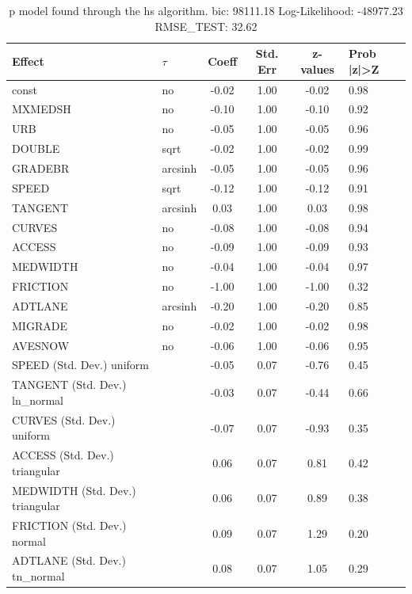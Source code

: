 \begin{table}
	\caption{p model found through the hs algorithm. bic: 98111.18 Log-Likelihood: -48977.23 RMSE_TEST: 32.62}
	\begin{center}
		\begin{tabular}{|l|l|c|c|c|l|}
			\hline
			Effect & $\tau$ & Coeff & Std. Err & z-values & Prob |z|>Z \\
			\hline
			const & no & -0.02 & 1.00 & -0.02 & 0.98 \\
			\hline
			MXMEDSH & no & -0.10 & 1.00 & -0.10 & 0.92 \\
			\hline
			URB & no & -0.05 & 1.00 & -0.05 & 0.96 \\
			\hline
			DOUBLE & sqrt & -0.02 & 1.00 & -0.02 & 0.99 \\
			\hline
			GRADEBR & arcsinh & -0.05 & 1.00 & -0.05 & 0.96 \\
			\hline
			SPEED & sqrt & -0.12 & 1.00 & -0.12 & 0.91 \\
			\hline
			TANGENT & arcsinh & 0.03 & 1.00 & 0.03 & 0.98 \\
			\hline
			CURVES & no & -0.08 & 1.00 & -0.08 & 0.94 \\
			\hline
			ACCESS & no & -0.09 & 1.00 & -0.09 & 0.93 \\
			\hline
			MEDWIDTH & no & -0.04 & 1.00 & -0.04 & 0.97 \\
			\hline
			FRICTION & no & -1.00 & 1.00 & -1.00 & 0.32 \\
			\hline
			ADTLANE & arcsinh & -0.20 & 1.00 & -0.20 & 0.85 \\
			\hline
			MIGRADE & no & -0.02 & 1.00 & -0.02 & 0.98 \\
			\hline
			AVESNOW & no & -0.06 & 1.00 & -0.06 & 0.95 \\
			\hline
			SPEED (Std. Dev.) uniform &  & -0.05 & 0.07 & -0.76 & 0.45 \\
			\hline
			TANGENT (Std. Dev.) ln_normal &  & -0.03 & 0.07 & -0.44 & 0.66 \\
			\hline
			CURVES (Std. Dev.) uniform &  & -0.07 & 0.07 & -0.93 & 0.35 \\
			\hline
			ACCESS (Std. Dev.) triangular &  & 0.06 & 0.07 & 0.81 & 0.42 \\
			\hline
			MEDWIDTH (Std. Dev.) triangular &  & 0.06 & 0.07 & 0.89 & 0.38 \\
			\hline
			FRICTION (Std. Dev.) normal &  & 0.09 & 0.07 & 1.29 & 0.20 \\
			\hline
			ADTLANE (Std. Dev.) tn_normal &  & 0.08 & 0.07 & 1.05 & 0.29 \\

\end{tabular}
\end{center}
\end{table}
